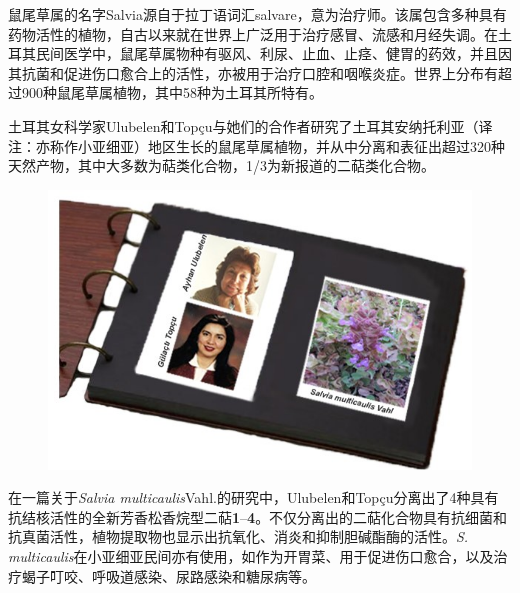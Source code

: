 鼠尾草属的名字Salvia源自于拉丁语词汇salvare，意为治疗师。该属包含多种具有药物活性的植物，自古以来就在世界上广泛用于治疗感冒、流感和月经失调。在土耳其民间医学中，鼠尾草属物种有驱风、利尿、止血、止痉、健胃的药效，并且因其抗菌和促进伤口愈合上的活性，亦被用于治疗口腔和咽喉炎症。世界上分布有超过900种鼠尾草属植物，其中58种为土耳其所特有。

土耳其女科学家Ulubelen和Topçu与她们的合作者研究了土耳其安纳托利亚（译注：亦称作小亚细亚）地区生长的鼠尾草属植物，并从中分离和表征出超过320种天然产物，其中大多数为萜类化合物，1/3为新报道的二萜类化合物。

\begin{figure}[h]
	\centering
	\includegraphics[width=12cm]{./pic/t1-1.jpg}
\end{figure}

在一篇关于\emph{Salvia multicaulis}Vahl.的研究中，Ulubelen和Topçu分离出了4种具有抗结核活性的全新芳香松香烷型二萜\textbf{1}--\textbf{4}。不仅分离出的二萜化合物具有抗细菌和抗真菌活性，植物提取物也显示出抗氧化、消炎和抑制胆碱酯酶的活性。\emph{S. multicaulis}在小亚细亚民间亦有使用，如作为开胃菜、用于促进伤口愈合，以及治疗蝎子叮咬、呼吸道感染、尿路感染和糖尿病等。

